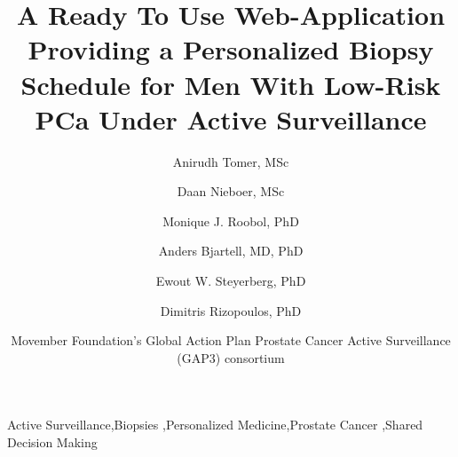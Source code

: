 \documentclass[review, 12pt]{elsarticle}
\begin{document}
\begin{frontmatter}

\title{A Ready To Use Web-Application Providing a Personalized Biopsy Schedule for Men With Low-Risk PCa Under Active Surveillance}

\author[1]{Anirudh Tomer, MSc} 

\author[2,3]{Daan Nieboer, MSc}

\author[3]{Monique J. Roobol, PhD}

\author[4]{Anders Bjartell, MD, PhD}

\author[2,5]{Ewout W. Steyerberg, PhD}

\author[1]{Dimitris Rizopoulos, PhD}

\author[6]{Movember Foundation's Global Action Plan Prostate Cancer Active Surveillance (GAP3) consortium}

\address[1]{Department of Biostatistics, Erasmus University Medical Center, Rotterdam, the Netherlands}
\address[2]{Department of Public Health, Erasmus University Medical Center, Rotterdam, the Netherlands}
\address[3]{Department of Urology, Erasmus University Medical Center, Rotterdam, the Netherlands}
\address[4]{Department of Urology, Sk\r{a}ne University Hospital, Malm\"{o}, Sweden}
\address[5]{Department of Biomedical Data Sciences, Leiden University Medical Center, Leiden, the Netherlands}
\address[6]{The Movember Foundation's Global Action Plan Prostate Cancer Active Surveillance (GAP3) consortium members presented in Appendix A}




\begin{keyword}
Active Surveillance\sep Biopsies \sep Personalized Medicine\sep Prostate Cancer \sep Shared Decision Making
\end{keyword}

\end{frontmatter}
\end{document}
